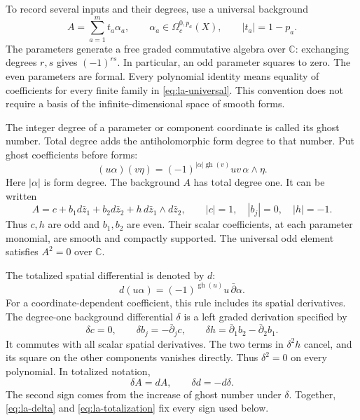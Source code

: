 To record several inputs and their degrees, use a universal
background
\begin{equation}\label{eq:la-universal}
 A=\sum_{a=1}^m t_a\alpha_a,
 \qquad \alpha_a\in\Omega_c^{0,p_a}(X),
 \qquad |t_a|=1-p_a.
\end{equation}
The parameters generate a free graded commutative algebra over
$\mathbb C$: exchanging degrees $r,s$ gives $(-1)^{rs}$.
In particular, an odd parameter squares to zero. The even
parameters are formal. Every polynomial identity means equality
of coefficients for every finite family in
\eqref{eq:la-universal}. This convention does not require a
basis of the infinite-dimensional space of smooth forms.

The integer degree of a parameter or component coordinate is
called its ghost number. Total degree adds the antiholomorphic
form degree to that number. Put ghost coefficients before forms:
\begin{equation}\label{eq:la-totalization}
 (u\alpha)(v\eta)
 =(-1)^{|\alpha|\operatorname{gh}(v)}
   uv\,\alpha\wedge\eta.
\end{equation}
Here $|\alpha|$ is form degree. The background $A$ has total
degree one. It can be written
\begin{equation}\label{eq:la-components}
 A=c+b_1d\bar z_1+b_2d\bar z_2
       +h\,d\bar z_1\wedge d\bar z_2,
 \qquad |c|=1,\quad |b_j|=0,\quad |h|=-1.
\end{equation}
Thus $c,h$ are odd and $b_1,b_2$ are even. Their scalar
coefficients, at each parameter monomial, are smooth and compactly
supported. The universal odd element satisfies $A^2=0$ over
$\mathbb C$.

The totalized spatial differential is denoted by $d$:
\[
 d(u\alpha)=(-1)^{\operatorname{gh}(u)}
             u\,\bar\partial\alpha.
\]
For a coordinate-dependent coefficient, this rule includes its
spatial derivatives. The degree-one background differential
$\delta$ is a left graded derivation specified by
\begin{equation}\label{eq:la-delta}
 \delta c=0,\qquad
 \delta b_j=-\bar\partial_jc,\qquad
 \delta h=\bar\partial_1b_2-\bar\partial_2b_1.
\end{equation}
It commutes with all scalar spatial derivatives. The two terms
in $\delta^2h$ cancel, and its square on the other components
vanishes directly. Thus $\delta^2=0$ on every polynomial.
In totalized notation,
\begin{equation}\label{eq:la-super-delta}
 \delta A=dA,\qquad \delta d=-d\delta.
\end{equation}
The second sign comes from the increase of ghost number under
$\delta$. Together, \eqref{eq:la-delta} and
\eqref{eq:la-totalization} fix every sign used below.

